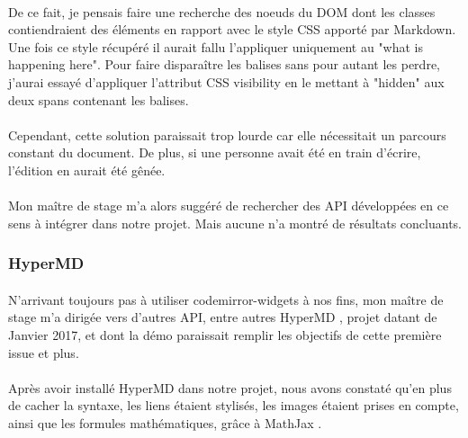 \documentclass[12pt]{article}
\begin{document}
\paragraph{}
De ce fait, je pensais faire une recherche des noeuds du DOM dont les classes contiendraient des éléments en rapport avec le style CSS apporté par Markdown. Une fois ce style récupéré il aurait fallu l'appliquer uniquement au "what is happening here". Pour faire disparaître les balises sans pour autant les perdre, j'aurai essayé d'appliquer l'attribut CSS visibility en le mettant à "hidden" aux deux spans contenant les balises.
\paragraph{}
Cependant, cette solution paraissait trop lourde car elle nécessitait un parcours constant du document. De plus, si une personne avait été en train d'écrire, l'édition en aurait été gênée.

\paragraph{}
Mon maître de stage m'a alors suggéré de rechercher des API développées en ce sens à intégrer dans notre projet. Mais aucune n'a montré de résultats concluants.

\subsubsection{HyperMD}
\paragraph{}
N'arrivant toujours pas à utiliser codemirror-widgets à nos fins, mon maître de stage m'a dirigée vers d'autres API, entre autres HyperMD \cite{hypermd}, projet datant de Janvier 2017, et dont la démo \cite{demo} paraissait remplir les objectifs de cette première issue et plus.
\paragraph{}
Après avoir installé HyperMD dans notre projet, nous avons constaté qu'en plus de cacher la syntaxe, les liens étaient stylisés, les images étaient prises en compte, ainsi que les formules mathématiques, grâce à MathJax \cite{mathjax}.
\end{document}
